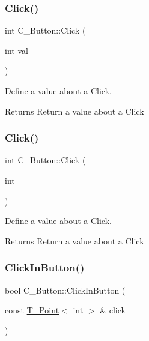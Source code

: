 \subsubsection{\texorpdfstring{Click()}{Click()}\hspace{0.1cm}{\footnotesize\ttfamily [1/2]}}
{\footnotesize\ttfamily int C\+\_\+\+Button\+::\+Click (\begin{DoxyParamCaption}\item[{int}]{val }\end{DoxyParamCaption})}



Define a value about a Click. 

\begin{DoxyReturn}{Returns}
Return a value about a Click 
\end{DoxyReturn}
\mbox{\label{classC__Button_ac743591b5933dd95b571d5956c7d669b}} 
\subsubsection{\texorpdfstring{Click()}{Click()}\hspace{0.1cm}{\footnotesize\ttfamily [2/2]}}
{\footnotesize\ttfamily int C\+\_\+\+Button\+::\+Click (\begin{DoxyParamCaption}\item[{int}]{ }\end{DoxyParamCaption})}



Define a value about a Click. 

\begin{DoxyReturn}{Returns}
Return a value about a Click 
\end{DoxyReturn}
\mbox{\label{classC__Button_a805c797b9afdddb5896a516a3e783882}} 
\subsubsection{\texorpdfstring{Click\+In\+Button()}{ClickInButton()}\hspace{0.1cm}{\footnotesize\ttfamily [1/2]}}
{\footnotesize\ttfamily bool C\+\_\+\+Button\+::\+Click\+In\+Button (\begin{DoxyParamCaption}\item[{const \hyperlink{classT__Point}{T\+\_\+\+Point}$<$ int $>$ \&}]{click }\end{DoxyParamCaption})}



